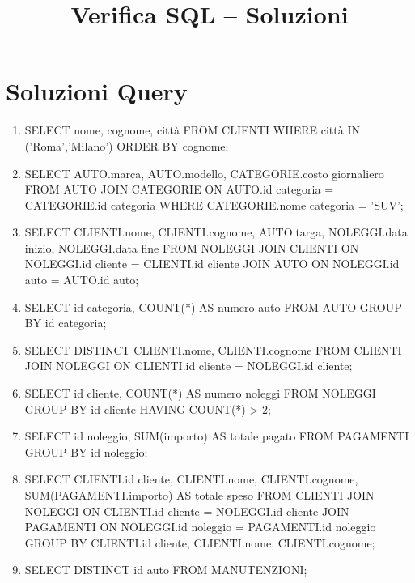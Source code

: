 \documentclass[a4paper,12pt]{article}
\begin{document}
	
	\title{Verifica SQL – Soluzioni}
	\date{}
	\maketitle
	
	\section*{Soluzioni Query}
	
	\begin{enumerate}
		
		\item 
		SELECT nome, cognome, città
		FROM CLIENTI
		WHERE città IN ('Roma','Milano')
		ORDER BY cognome;
		
		\item 
		SELECT AUTO.marca, AUTO.modello, CATEGORIE.costo giornaliero
		FROM AUTO
		JOIN CATEGORIE ON AUTO.id categoria = CATEGORIE.id categoria
		WHERE CATEGORIE.nome categoria = 'SUV';
		
		\item 
		SELECT CLIENTI.nome, CLIENTI.cognome, AUTO.targa, NOLEGGI.data inizio, NOLEGGI.data fine
		FROM NOLEGGI
		JOIN CLIENTI ON NOLEGGI.id cliente = CLIENTI.id cliente
		JOIN AUTO ON NOLEGGI.id auto = AUTO.id auto;
		
		\item 
		SELECT id categoria, COUNT(*) AS numero auto
		FROM AUTO
		GROUP BY id categoria;
		
		\item 
		SELECT DISTINCT CLIENTI.nome, CLIENTI.cognome
		FROM CLIENTI
		JOIN NOLEGGI ON CLIENTI.id cliente = NOLEGGI.id cliente;
		
		\item 
		SELECT id cliente, COUNT(*) AS numero noleggi
		FROM NOLEGGI
		GROUP BY id cliente
		HAVING COUNT(*) > 2;
		
		\item 
		SELECT id noleggio, SUM(importo) AS totale pagato
		FROM PAGAMENTI
		GROUP BY id noleggio;
		
		\item 
		SELECT CLIENTI.id cliente, CLIENTI.nome, CLIENTI.cognome, SUM(PAGAMENTI.importo) AS totale speso
		FROM CLIENTI
		JOIN NOLEGGI ON CLIENTI.id cliente = NOLEGGI.id cliente
		JOIN PAGAMENTI ON NOLEGGI.id noleggio = PAGAMENTI.id noleggio
		GROUP BY CLIENTI.id cliente, CLIENTI.nome, CLIENTI.cognome;
		
		\item 
		SELECT DISTINCT id auto
		FROM MANUTENZIONI;
		

\end{enumerate}
\end{document}
